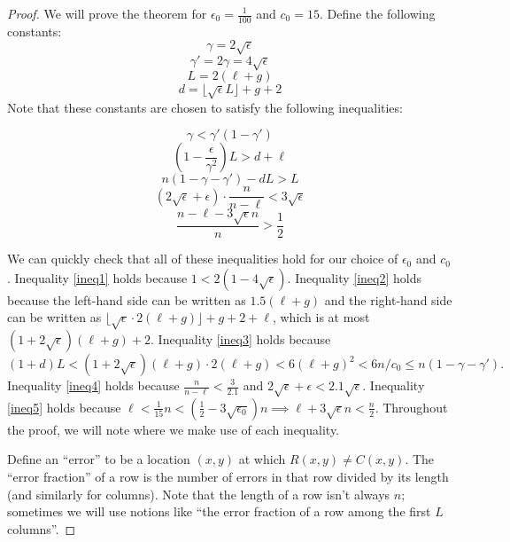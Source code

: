 \documentclass[11pt]{article}
\newcommand{\mnote}[1]{{\color{teal} [Madhu: #1]}}
\newcommand{\mnote}[1]{}
\renewcommand{\d}{d}
\begin{document}
\begin{proof}
We will prove the theorem for $\epsilon_0 = \frac{1}{100}$ and $c_0 = 15$.
Define the following constants:
$$\gamma = 2\sqrt{\epsilon}$$
$$\gamma' = 2\gamma = 4\sqrt{\epsilon}$$
$$L = 2 (\ell + g)$$
$$\d = \lfloor \sqrt{\epsilon} L \rfloor + g + 2$$
Note that these constants are chosen to satisfy the following inequalities:

\begin{equation} \label{ineq1}
    \gamma < \gamma'(1-\gamma')
\end{equation}
\begin{equation} \label{ineq2}
    \left(1-\frac{\epsilon}{\gamma^2}\right)L > d + \ell
\end{equation}
\begin{equation} \label{ineq3}
    n(1 - \gamma - \gamma') - dL > L
\end{equation}
\begin{equation} \label{ineq4}
    (2\sqrt{\epsilon} + \epsilon) \cdot \frac{n}{n-\ell} < 3\sqrt{\epsilon}
\end{equation}
\begin{equation} \label{ineq5}
    \frac{n - \ell - 3\sqrt{\epsilon}n}{n} > \frac 12
\end{equation}

We can quickly check that all of these inequalities hold for our choice of $\epsilon_0$ and $c_0$. Inequality \eqref{ineq1} holds because $1 < 2(1-4\sqrt{\epsilon})$. Inequality \eqref{ineq2} holds because the left-hand side can be written as $1.5(\ell + g)$ and the right-hand side can be written as $\lfloor \sqrt{\epsilon} \cdot 2(\ell+g) \rfloor + g + 2 +\ell$, which is at most $(1+2\sqrt{\epsilon})(\ell+g) + 2$.  Inequality \eqref{ineq3} holds because $(1+d)L < (1 + 2\sqrt{\epsilon}) (\ell + g)  \cdot 2(\ell + g) < 6(\ell + g)^2 < 6n/c_0  \leq n(1 - \gamma - \gamma').$ Inequality \eqref{ineq4} holds because $\frac{n}{n-\ell} < \frac{3}{2.1}$ and $2\sqrt{\epsilon} + \epsilon < 2.1 \sqrt{\epsilon}$. Inequality \eqref{ineq5} holds because $\ell < \frac{1}{15}n < (\frac 12 - 3\sqrt{\epsilon_0})n \implies \ell + 3\sqrt{\epsilon}n < \frac{n}{2}$.
Throughout the proof, we will note where we make use of each inequality.

Define an ``error'' to be a location $(x, y)$ at which $R(x, y) \neq C(x, y)$. The ``error fraction'' of a row is the number of errors in that row divided by its length (and similarly for columns). Note that the length of a row isn't always $n$; sometimes we will use notions like ``the error fraction of a row among the first $L$ columns''.


\end{proof}
\end{document}
